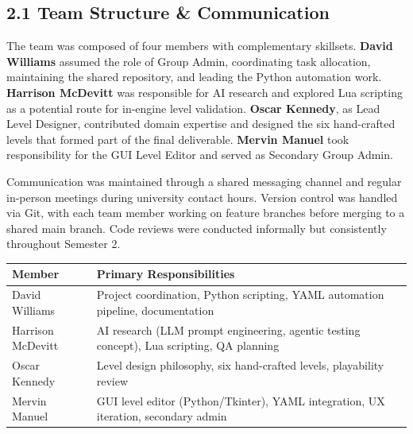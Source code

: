 \subsection{2.1 Team Structure \&
Communication}\label{team-structure-communication}

The team was composed of four members with complementary skillsets.
\textbf{David Williams} assumed the role of Group Admin, coordinating
task allocation, maintaining the shared repository, and leading the
Python automation work. \textbf{Harrison McDevitt} was responsible for
AI research and explored Lua scripting as a potential route for
in-engine level validation. \textbf{Oscar Kennedy}, as Lead Level
Designer, contributed domain expertise and designed the six hand-crafted
levels that formed part of the final deliverable. \textbf{Mervin Manuel}
took responsibility for the GUI Level Editor and served as Secondary
Group Admin.

Communication was maintained through a shared messaging channel and
regular in-person meetings during university contact hours. Version
control was handled via Git, with each team member working on feature
branches before merging to a shared main branch. Code reviews were
conducted informally but consistently throughout Semester 2.

\begin{longtable}[]{@{}
  >{\raggedright\arraybackslash}p{}
  >{\raggedright\arraybackslash}p{}@{}}
\toprule\noalign{}
\begin{minipage}[b]{\linewidth}\raggedright
Member
\end{minipage} & \begin{minipage}[b]{\linewidth}\raggedright
Primary Responsibilities
\end{minipage} \\
\midrule\noalign{}
\endhead
\bottomrule\noalign{}
\endlastfoot
David Williams & Project coordination, Python scripting, YAML automation
pipeline, documentation \\
Harrison McDevitt & AI research (LLM prompt engineering, agentic testing
concept), Lua scripting, QA planning \\
Oscar Kennedy & Level design philosophy, six hand-crafted levels,
playability review \\
Mervin Manuel & GUI level editor (Python/Tkinter), YAML integration, UX
iteration, secondary admin \\
\end{longtable}

